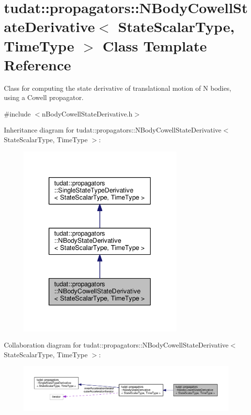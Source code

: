 \hypertarget{classtudat_1_1propagators_1_1NBodyCowellStateDerivative}{}\section{tudat\+:\+:propagators\+:\+:N\+Body\+Cowell\+State\+Derivative$<$ State\+Scalar\+Type, Time\+Type $>$ Class Template Reference}
\label{classtudat_1_1propagators_1_1NBodyCowellStateDerivative}


Class for computing the state derivative of translational motion of N bodies, using a Cowell propagator.  




{\ttfamily \#include $<$n\+Body\+Cowell\+State\+Derivative.\+h$>$}



Inheritance diagram for tudat\+:\+:propagators\+:\+:N\+Body\+Cowell\+State\+Derivative$<$ State\+Scalar\+Type, Time\+Type $>$\+:
\nopagebreak
\begin{figure}[H]
\begin{center}
\leavevmode
\includegraphics[width=237pt]{classtudat_1_1propagators_1_1NBodyCowellStateDerivative__inherit__graph}
\end{center}
\end{figure}


Collaboration diagram for tudat\+:\+:propagators\+:\+:N\+Body\+Cowell\+State\+Derivative$<$ State\+Scalar\+Type, Time\+Type $>$\+:
\nopagebreak
\begin{figure}[H]
\begin{center}
\leavevmode
\includegraphics[width=350pt]{classtudat_1_1propagators_1_1NBodyCowellStateDerivative__coll__graph}
\end{center}
\end{figure}

